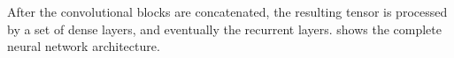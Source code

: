 
After the convolutional blocks are concatenated, the
resulting tensor is processed by a set of dense layers, and
eventually the recurrent layers. 
shows the complete neural network architecture.

